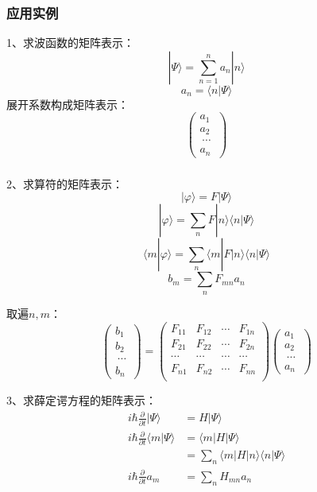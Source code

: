 \begin{frame} 
    \frametitle{应用实例}  
    1、求波函数的矩阵表示：  
    $$|\Psi \rangle =\sum\limits_{n=1} ^n a_n |n \rangle$$
    $$ a_n= \langle n | \Psi \rangle$$ 
    展开系数构成矩阵表示：  
    $$\begin{pmatrix}
    a_1\\
    a_2\\\
    \cdots\\
    a_n\
    \end{pmatrix} $$
\end{frame} 

\begin{frame} 
    \frametitle{}  
    2、求算符的矩阵表示：  
    $$|\varphi \rangle = F |\Psi \rangle$$
    $$|\varphi \rangle = \sum_n F |n\rangle\langle n |\Psi \rangle$$
    $$\langle m |\varphi \rangle = \sum_n  \langle m| F |n\rangle\langle n |\Psi \rangle$$
    $$ b_m = \sum_n  F_{mn} a_n$$

    取遍$n,m$：  
    $$\begin{pmatrix}
    b_1\\
    b_2\\\
    \cdots\\
    b_n\
    \end{pmatrix} 
    = 
    \begin{pmatrix}
        F_{11} & F_{12} & \cdots & F_{1n} \\
        F_{21} & F_{22} & \cdots & F_{2n} \\
        \cdots & \cdots &  \cdots &  \cdots \\
        F_{n1} & F_{n2} & \cdots & F_{nn} \\
    \end{pmatrix} 
    \begin{pmatrix}
        a_1\\
        a_2\\\
        \cdots\\
        a_n\
    \end{pmatrix} 
    $$
\end{frame} 

\begin{frame} 
    3、求薛定谔方程的矩阵表示： 
    $$ \begin{aligned}
    i \hbar \frac{\partial}{\partial t} |\Psi \rangle &= H |\Psi \rangle  \\
    i \hbar \frac{\partial}{\partial t} \langle m |\Psi \rangle &= \langle m |H |\Psi \rangle \\ 
     &= \sum_n \langle m |H |n\rangle\langle n |\Psi \rangle  \\
     i \hbar \frac{\partial}{\partial t} a_m  &= \sum_n H_{mn} a_n 
    \end{aligned}
    $$
\end{frame} 

